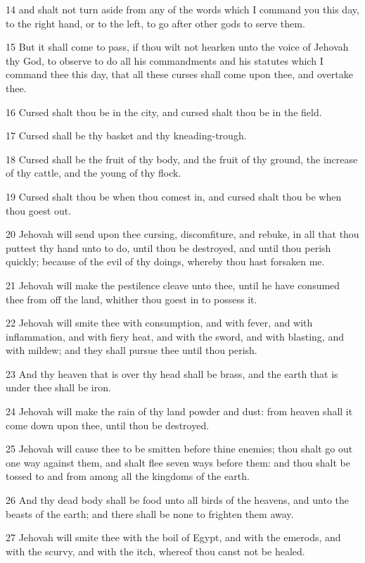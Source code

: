 \par 14 and shalt not turn aside from any of the words which I command you this day, to the right hand, or to the left, to go after other gods to serve them.
\par 15 But it shall come to pass, if thou wilt not hearken unto the voice of Jehovah thy God, to observe to do all his commandments and his statutes which I command thee this day, that all these curses shall come upon thee, and overtake thee.
\par 16 Cursed shalt thou be in the city, and cursed shalt thou be in the field.
\par 17 Cursed shall be thy basket and thy kneading-trough.
\par 18 Cursed shall be the fruit of thy body, and the fruit of thy ground, the increase of thy cattle, and the young of thy flock.
\par 19 Cursed shalt thou be when thou comest in, and cursed shalt thou be when thou goest out.
\par 20 Jehovah will send upon thee cursing, discomfiture, and rebuke, in all that thou puttest thy hand unto to do, until thou be destroyed, and until thou perish quickly; because of the evil of thy doings, whereby thou hast forsaken me.
\par 21 Jehovah will make the pestilence cleave unto thee, until he have consumed thee from off the land, whither thou goest in to possess it.
\par 22 Jehovah will smite thee with consumption, and with fever, and with inflammation, and with fiery heat, and with the sword, and with blasting, and with mildew; and they shall pursue thee until thou perish.
\par 23 And thy heaven that is over thy head shall be brass, and the earth that is under thee shall be iron.
\par 24 Jehovah will make the rain of thy land powder and dust: from heaven shall it come down upon thee, until thou be destroyed.
\par 25 Jehovah will cause thee to be smitten before thine enemies; thou shalt go out one way against them, and shalt flee seven ways before them: and thou shalt be tossed to and from among all the kingdoms of the earth.
\par 26 And thy dead body shall be food unto all birds of the heavens, and unto the beasts of the earth; and there shall be none to frighten them away.
\par 27 Jehovah will smite thee with the boil of Egypt, and with the emerods, and with the scurvy, and with the itch, whereof thou canst not be healed.
